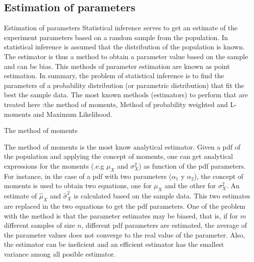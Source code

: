 \documentclass[8pt]{beamer}
\renewcommand{\emph}[1]{\textcolor{myorange}{#1}}
\begin{document}
\subsection{Estimation of parameters} %
\begin{frame}{Estimation of parameters}
    \alert{Statistical inference} serves to get an estimate of the experiment parameters based on a random sample from the population. In statistical inference is assumed that the distribution of the population is known. The \alert{estimator} is thus a method to obtain a parameter value based on the sample and can be \emph{bias}. This methods of parameter estimation are known as \alert{point estimation}. In summary, the problem of statistical inference is to find the parameters of a probability distribution (or parametric distribution) that fit the best the sample data. The most known methods (estimators) to perform that are treated here :\emph{the method of moments}, \emph{Method of probability weighted and L-moments} and \emph{Maximum Likelihood}.

    \begin{block}{The method of moments}

        The \alert{method of moments} is the most know analytical estimator. Given a \emph{pdf} of the population and applying the concept of moments, one can get analytical expressions for the moments (.e.g $\mu_X$ and $\sigma_X^2$) as function of the pdf parameters. For instance, in the case of a \emph{pdf} with two parameters ($\alpha_1$ y $\alpha_2$), the concept of moments is used to obtain two equations, one for $\mu_X$ and the other for $\sigma_X^2$. An estimate of $\hat{\mu}_X$ and $\hat{\sigma}_X^2$ is calculated based on the sample data. This two estimates are replaced in the two equations to get the \emph{pdf} parameters. One of the problem with the method is that the parameter estimates may be biased, that is, if for $m$ different samples of size $n$, different \emph{pdf} parameters are estimated, the average of the parameter values does not converge to the real value of the parameter. Also, the estimator can be ineficient and an efficient estimator has the smallest variance among all posible estimator.  

    \end{block}
\end{frame}
\end{document}
